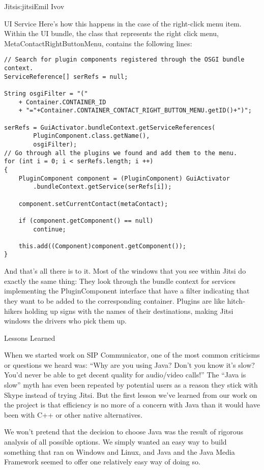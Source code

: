\begin{aosachapter}{Jitsi}{s:jitsi}{Emil Ivov}
\begin{aosasect1}{UI Service}
Here's how this happens in the case of the right-click menu
item. Within the UI bundle, the class that represents the right click
menu, MetaContactRightButtonMenu, contains the following lines:

\begin{verbatim}
// Search for plugin components registered through the OSGI bundle context.
ServiceReference[] serRefs = null;

String osgiFilter = "("
    + Container.CONTAINER_ID
    + "="+Container.CONTAINER_CONTACT_RIGHT_BUTTON_MENU.getID()+")";

serRefs = GuiActivator.bundleContext.getServiceReferences(
        PluginComponent.class.getName(),
        osgiFilter);
// Go through all the plugins we found and add them to the menu.
for (int i = 0; i < serRefs.length; i ++)
{
    PluginComponent component = (PluginComponent) GuiActivator
        .bundleContext.getService(serRefs[i]);

    component.setCurrentContact(metaContact);

    if (component.getComponent() == null)
        continue;

    this.add((Component)component.getComponent());
}
\end{verbatim}

\noindent And that's all there is to it. Most of the windows that you see within
Jitsi do exactly the same thing: They look through the bundle context
for services implementing the PluginComponent interface that have a
filter indicating that they want to be added to the corresponding
container.  Plugins are like hitch-hikers holding up signs with the
names of their destinations, making Jitsi windows the drivers who pick
them up.

\end{aosasect1}

\begin{aosasect1}{Lessons Learned}

When we started work on SIP Communicator, one of the most common
criticisms or questions we heard was: ``Why are you using Java? Don't
you know it's slow? You'd never be able to get decent quality for
audio/video calls!'' The ``Java is slow'' myth has even been repeated
by potential users as a reason they stick with Skype instead of trying
Jitsi. But the first lesson we've learned from our work on the project
is that efficiency is no more of a concern with Java than it would
have been with C++ or other native alternatives.

We won't pretend that the decision to choose Java was the result of
rigorous analysis of all possible options. We simply wanted an easy
way to build something that ran on Windows and Linux, and Java and the
Java Media Framework seemed to offer one relatively easy way of doing
so.


\end{aosasect1}
\end{aosachapter}
